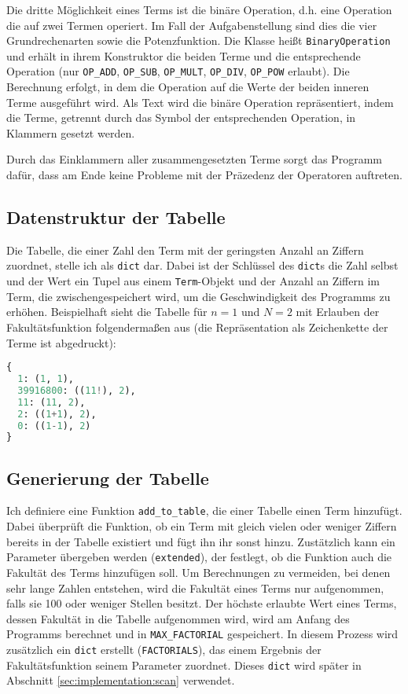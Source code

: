 \documentclass[a4paper,10pt,ngerman]{scrartcl}
\begin{document}
Die dritte Möglichkeit eines Terms ist die binäre Operation, d.h. eine Operation die auf zwei Termen operiert.
Im Fall der Aufgabenstellung sind dies die vier Grundrechenarten sowie die Potenzfunktion.
Die Klasse heißt \texttt{BinaryOperation} und erhält in ihrem Konstruktor die beiden Terme und die entsprechende Operation (nur \texttt{OP\_ADD}, \texttt{OP\_SUB}, \texttt{OP\_MULT}, \texttt{OP\_DIV}, \texttt{OP\_POW} erlaubt).
Die Berechnung erfolgt, in dem die Operation auf die Werte der beiden inneren Terme ausgeführt wird.
Als Text wird die binäre Operation repräsentiert, indem die Terme, getrennt durch das Symbol der entsprechenden Operation, in Klammern gesetzt werden.

Durch das Einklammern aller zusammengesetzten Terme sorgt das Programm dafür, dass am Ende keine Probleme mit der Präzedenz der Operatoren auftreten.

\subsection{Datenstruktur der Tabelle}
Die Tabelle, die einer Zahl den Term mit der geringsten Anzahl an Ziffern zuordnet, stelle ich als \texttt{dict} dar.
Dabei ist der Schlüssel des \texttt{dict}s die Zahl selbst und der Wert ein Tupel aus einem \texttt{Term}-Objekt und der Anzahl an Ziffern im Term, die zwischengespeichert wird, um die Geschwindigkeit des Programms zu erhöhen.
Beispielhaft sieht die Tabelle für $n=1$ und $N=2$ mit Erlauben der Fakultätsfunktion folgendermaßen aus (die Repräsentation als Zeichenkette der Terme ist abgedruckt):

\begin{lstlisting}[language=Python]
{
  1: (1, 1),
  39916800: ((11!), 2),
  11: (11, 2),
  2: ((1+1), 2),
  0: ((1-1), 2)
}
\end{lstlisting}

\subsection{Generierung der Tabelle}
Ich definiere eine Funktion \texttt{add\_to\_table}, die einer Tabelle einen Term hinzufügt.
Dabei überprüft die Funktion, ob ein Term mit gleich vielen oder weniger Ziffern bereits in der Tabelle existiert und fügt ihn ihr sonst hinzu.
Zustätzlich kann ein Parameter übergeben werden (\texttt{extended}), der festlegt, ob die Funktion auch die Fakultät des Terms hinzufügen soll.
Um Berechnungen zu vermeiden, bei denen sehr lange Zahlen entstehen, wird die Fakultät eines Terms nur aufgenommen, falls sie 100 oder weniger Stellen besitzt.
Der höchste erlaubte Wert eines Terms, dessen Fakultät in die Tabelle aufgenommen wird, wird am Anfang des Programms berechnet und in \texttt{MAX\_FACTORIAL} gespeichert.
In diesem Prozess wird zusätzlich ein \texttt{dict} erstellt (\texttt{FACTORIALS}), das einem Ergebnis der Fakultätsfunktion seinem Parameter zuordnet.
Dieses \texttt{dict} wird später in Abschnitt \ref{sec:implementation:scan} verwendet.
\end{document}
